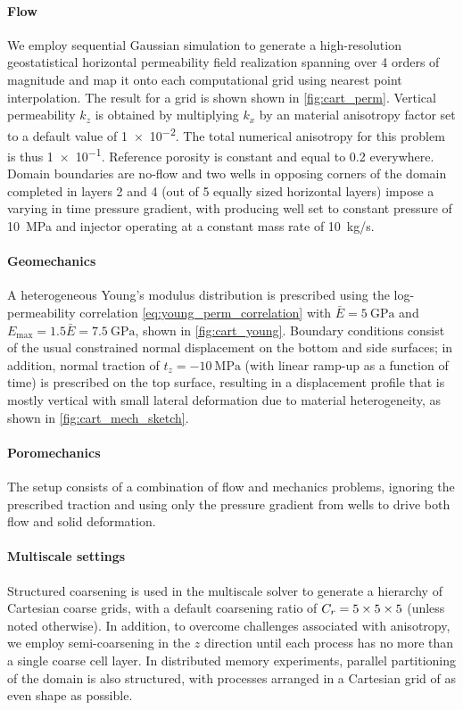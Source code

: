 \paragraph{Flow}
We employ sequential Gaussian simulation to generate a high-resolution geostatistical horizontal permeability field realization spanning over 4 orders of magnitude and map it onto each computational grid using nearest point interpolation. The result for a  grid is shown shown in \cref{fig:cart_perm}.   Vertical permeability $k_z$ is obtained by multiplying $k_x$ by an material anisotropy factor set to a default value of \num{1e-2}.   The total numerical anisotropy for this problem is thus \num{1e-1}.    Reference porosity is constant and equal to 0.2 everywhere.   Domain boundaries are no-flow and two wells in opposing corners of the domain completed in layers 2 and 4 (out of 5 equally sized horizontal layers)  impose a varying in time pressure gradient, with producing well set to constant pressure of \qty{10}{\MPa} and injector operating at a constant mass rate of \qty{10}{kg/s}.

\paragraph{Geomechanics}
A heterogeneous Young's modulus distribution is prescribed using the log-permeability correlation \cref{eq:young_perm_correlation} with $\bar{E} = \qty{5}{\GPa}$ and $E_{\max} = 1.5 \bar{E} = \qty{7.5}{\GPa}$, shown in \cref{fig:cart_young}.   Boundary conditions consist of the usual constrained normal displacement on the bottom and side surfaces; in addition, normal traction of $t_z = -\qty{10}{\MPa}$ (with linear ramp-up as a function of time) is prescribed on the top surface, resulting in a displacement profile that is mostly vertical with small lateral deformation due to material heterogeneity, as shown in \cref{fig:cart_mech_sketch}.

\paragraph{Poromechanics}
The setup consists of a combination of flow and mechanics problems, ignoring the prescribed traction and using only the pressure gradient from wells to drive both flow and solid deformation.

\paragraph{Multiscale settings}
Structured coarsening is used in the multiscale solver to generate a hierarchy of Cartesian coarse grids, with a default coarsening ratio of $C_r = \numproduct{5x5x5}$ (unless noted otherwise).   In addition, to overcome challenges associated with anisotropy, we employ semi-coarsening in the $z$ direction until each process has no more than a single coarse cell layer.   In distributed memory experiments, parallel partitioning of the domain is also structured, with processes arranged in a Cartesian grid of as even shape as possible.


